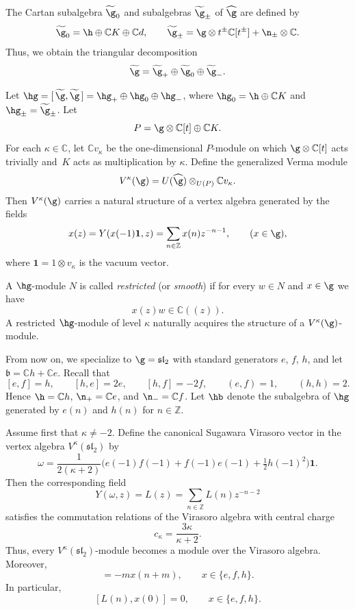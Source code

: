 \documentclass[pdftex]{sigma}
\numberwithin{equation}{section}
\theoremstyle{definition}
\let\frak\mathfrak
\newcommand{\1}{\textbf{1}}
\begin{document}
The Cartan subalgebra ${\widetilde{\g}}_0$ and subalgebras ${\widetilde{\g}}_{\pm}$ of ${\widehat{\g}}$ are defined by
\[
 {\widetilde{\g}}_0 = {\h} \oplus \mathbb{C}K \oplus \mathbb{C}d, \qquad
 {\widetilde{\g}}_{\pm} = \g \otimes t^{\pm}\mathbb{C}[t^{\pm}] + {\n}_{\pm} \otimes \mathbb{C}.
\]
Thus, we obtain the triangular decomposition
\[
 \widetilde{\g} = \widetilde{\g}_{+} \oplus \widetilde{\g}_{0} \oplus \widetilde{\g}_{-}.
\]

Let $\hg = [ \, \widetilde{\g}, \widetilde{\g} \, ] = \hg_{+} \oplus \hg_{0} \oplus \hg_{-}$,
where $\hg_{0} = {\h} \oplus \mathbb{C}K$ and $\hg_{\pm} = \widetilde{\g}_{\pm}$.
Let
\[
 P = {\g} \otimes \mathbb{C}[t] \oplus \mathbb{C}K.
\]
For each $\kappa \in \mathbb{C}$, let $\mathbb{C}v_{\kappa}$ be the one-dimensional $P$-module on which
${\g} \otimes \mathbb{C}[t]$ acts trivially and~$K$ acts as multiplication by $\kappa$.
Define the generalized Verma module
\[
 V^{\kappa}(\g) = U(\widehat{\g}) \otimes_{U(P)} \mathbb{C}v_{\kappa}.
\]
Then $V^{\kappa}(\g)$ carries a natural structure of a vertex algebra generated by the fields
\[
 x(z) = Y(x(-1)\mathbf{1}, z) = \sum_{n \in \mathbb{Z}} x(n) z^{-n-1},
 \qquad (x \in \g),
\]
where $\mathbf{1} = 1 \otimes v_{\kappa}$ is the vacuum vector.

A $\hg$-module $N$ is called \emph{restricted} (or \emph{smooth}) if for every $w \in N$ and $x \in \g$ we have
\[
 x(z) w \in \mathbb{C}((z)).
\]
A restricted $\hg$-module of level $\kappa$ naturally acquires the structure of a $V^{\kappa}(\g)$-module.

From now on, we specialize to $\g = \mathfrak{sl}_2$ with standard generators $e$, $f$, $h$,
and let ${\frak b} = \mathbb{C}h + \mathbb{C}e$.
Recall that
\[
 [e,f] = h, \qquad [h,e] = 2e, \qquad [h,f] = -2f, \qquad (e,f) = 1, \qquad (h,h) = 2.
\]
Hence $\h = \mathbb{C}h$, $\n_{+} = \mathbb{C}e$, and $\n_{-} = \mathbb{C}f$.
Let $\hb$ denote the subalgebra of $\hg$ generated by $e(n)$ and $h(n)$ for $n \in \mathbb{Z}$.

Assume first that $\kappa \neq -2$.
Define the canonical Sugawara Virasoro vector in the vertex algebra $V^{\kappa}(\mathfrak{sl}_2)$ by
\[
 \omega = \frac{1}{2(\kappa + 2)} \bigl( e(-1)f(-1) + f(-1)e(-1) + \tfrac{1}{2}h(-1)^2 \bigr)\mathbf{1}.
\]
Then the corresponding field
\[
 Y(\omega,z) = L(z) = \sum_{n \in \mathbb{Z}} L(n) z^{-n-2}
\]
satisfies the commutation relations of the Virasoro algebra with central charge
\[
 c_{\kappa} = \frac{3\kappa}{\kappa + 2}.
\]
Thus, every $V^{\kappa}(\mathfrak{sl}_2)$-module becomes a module over the Virasoro algebra.
Moreover,
\begin{equation*} %
 [L(n), x(m)] = -m x(n+m), \qquad x \in \{e,f,h\}.
\end{equation*}
In particular,
\[
 [L(n), x(0)] = 0, \qquad x \in \{e,f,h\}.
\]
\end{document}

